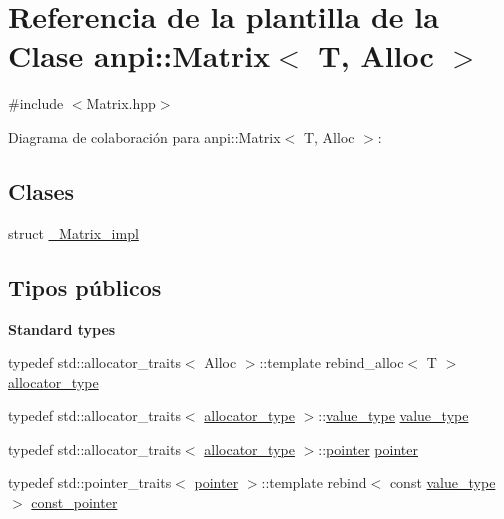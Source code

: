\hypertarget{classanpi_1_1Matrix}{}\section{Referencia de la plantilla de la Clase anpi\+:\+:Matrix$<$ T, Alloc $>$}
\label{classanpi_1_1Matrix}


{\ttfamily \#include $<$Matrix.\+hpp$>$}



Diagrama de colaboración para anpi\+:\+:Matrix$<$ T, Alloc $>$\+:
\subsection*{Clases}
\begin{DoxyCompactItemize}
\item 
struct \hyperlink{structanpi_1_1Matrix_1_1__Matrix__impl}{\+\_\+\+Matrix\+\_\+impl}
\end{DoxyCompactItemize}
\subsection*{Tipos públicos}
\begin{Indent}\textbf{ Standard types}\par
\begin{DoxyCompactItemize}
\item 
typedef std\+::allocator\+\_\+traits$<$ Alloc $>$\+::template rebind\+\_\+alloc$<$ T $>$ \hyperlink{classanpi_1_1Matrix_a3574b7528e3ddfb2f7cdf446be8286c1}{allocator\+\_\+type}
\item 
typedef std\+::allocator\+\_\+traits$<$ \hyperlink{classanpi_1_1Matrix_a3574b7528e3ddfb2f7cdf446be8286c1}{allocator\+\_\+type} $>$\+::\hyperlink{classanpi_1_1Matrix_ad755076524c16fc494a392b0a66065cb}{value\+\_\+type} \hyperlink{classanpi_1_1Matrix_ad755076524c16fc494a392b0a66065cb}{value\+\_\+type}
\item 
typedef std\+::allocator\+\_\+traits$<$ \hyperlink{classanpi_1_1Matrix_a3574b7528e3ddfb2f7cdf446be8286c1}{allocator\+\_\+type} $>$\+::\hyperlink{classanpi_1_1Matrix_a6d2754ddec71081f6e1c0e4c320e8f8e}{pointer} \hyperlink{classanpi_1_1Matrix_a6d2754ddec71081f6e1c0e4c320e8f8e}{pointer}
\item 
typedef std\+::pointer\+\_\+traits$<$ \hyperlink{classanpi_1_1Matrix_a6d2754ddec71081f6e1c0e4c320e8f8e}{pointer} $>$\+::template rebind$<$ const \hyperlink{classanpi_1_1Matrix_ad755076524c16fc494a392b0a66065cb}{value\+\_\+type} $>$ \hyperlink{classanpi_1_1Matrix_ac6d45526407ea4455424debdc4f21b91}{const\+\_\+pointer}
\end{DoxyCompactItemize}
\end{Indent}
